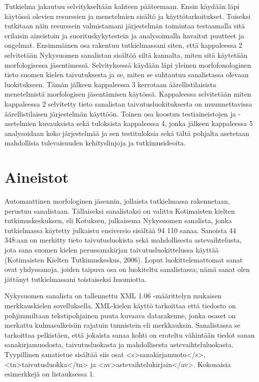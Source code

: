 \documentclass[free]{flammie}
\begin{document}
Tutkielma jakautuu selvitykseltään kahteen pääteemaan. Ensin käydään läpi
käytössä olevien resurssien ja menetelmien sisältö ja käyttötarkoitukset.
Toiseksi tutkitaan näin resurssein valmistamani järjestelmän toimintaa
testaamalla sitä erilaisin aineistoin ja suorituskykytestein ja analysoimalla
havaitut puutteet ja ongelmat. Ensimmäinen osa rakentuu tutkielmassani siten,
että kappaleessa 2 selvitetään Nykysuomen sanalistan sisältöä siltä kannalta,
miten sitä käytetään morfologisessa jäsentimessä. Selvityksessä käydään läpi
yleinen morfofonologinen tieto suomen kielen taivutuksesta ja se, miten se
suhtautuu sanalistassa olevaan luokitukseen. Tämän jälkeen kappaleessa 3
kerrotaan äärellistilaisista menetelmistä morfologisen jäsentämisen käytössä.
Kappaleessa selvitetään miten kappaleessa 2 selvitetty tieto sanalistan
taivutusluokituksesta on muunnettavissa äärellistilaisen järjestelmän käyttöön.
Toinen osa koostuu testiaineistojen ja -asetelmien kuvauksista sekä tuloksista
kappaleessa 4, jonka jälkeen kappaleessa 5 analysoidaan koko järjestelmää ja sen
testituloksia sekä tältä pohjalta asetetaan mahdollisia tulevaisuuden
kehityslinjoja ja tutkimusideoita.

\section{Aineistot}

Automaattinen morfologinen jäsennin, jollaista tutkielmassa rakennetaan,
perustuu sanalistaan. Tällaiseksi sanalistaksi on valittu Kotimaisten kielten
tutkimuskeskuksen, eli Kotuksen, julkaisema Nykysuomen sanalista, jonka
tutkielmassa käytetty julkaistu ensiversio sisältää 94 110 sanaa. Sanoista 44
348:aan on merkitty tieto taivutusluokista sekä mahdollisesta astevaihtelusta,
jota sana suomen kielen perussanakirjan taivutusluokittelussa käyttää
(Kotimaisten Kielten Tutkimuskeskus, 2006). Loput luokittelemattomat sanat ovat
yhdyssanoja, joiden taipuva osa on luokiteltu sanalistassa; nämä sanat olen
jättänyt tutkielmassani toistaiseksi huomiotta.

Nykysuomen sanalista on
tallennettu XML 1.06 -määrittelyn mukaisen merkkauskielen sovelluksella.
XML-kielen käyttö tarkoittaa että tiedosto on pohjimmiltaan tekstipohjainen
puuta kuvaava datarakenne, jonka osaset on merkattu kulmasulkeisiin rajatuin
tunnistein eli merkkauksin. Sanalistassa se tarkoittaa pelkistäen, että jokaista
sanaa kohti on eroteltu vähintään tiedot sanan sanakirjamuodosta,
taivutusluokasta ja mahdollisesta astevaihteluluokasta. Tyypillinen sanatietue
sisältää siis osat <s>sanakirjamuoto</s>, <tn>taivutusluokka</tn> ja
<av>astevaihtelukirjain</av>. Kokonaisia esimerkkejä on listauksessa 1.
\end{document}
